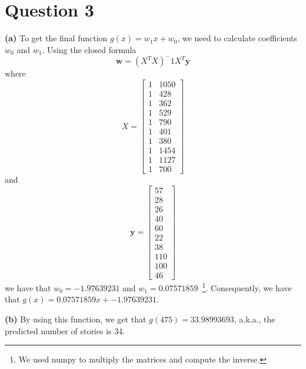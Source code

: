 \documentclass[leqno]{article}
\begin{document}
\section*{Question 3} \textbf{(a)} To get the final function $g(x) = w_1x + w_0$, we need to calculate coefficients $w_0$ and $w_1$. Using the closed 
formula
\begin{equation*}
\textbf{w} = (X^TX)^-1X^T\textbf{y}
\end{equation*}
where 
\[
X=
  \begin{bmatrix}
    1 & 1050\\
    1 & 428\\
    1 & 362\\
    1 & 529\\
    1 & 790\\
    1 & 401\\
    1 & 380\\
    1 & 1454\\
    1 & 1127\\
    1 & 700
  \end{bmatrix}
\]
and
\[
\textbf{y}=
  \begin{bmatrix}
     57\\
     28\\
     26\\
     40\\
     60\\
     22\\
     38\\
     110\\
     100\\
     46
  \end{bmatrix}
\]
we have that $w_0 = -1.97639231$ and $w_1 = 0.07571859$~\footnote{We used numpy to multiply the matrices and compute the inverse.}.
 Consequently, we have that $g(x) = 0.07571859x + -1.97639231$.

\hfill

\textbf{(b)} By using this function, we get that $g(475) = 33.98993693$, a.k.a., the predicted number of stories is 34.
\end{document}
